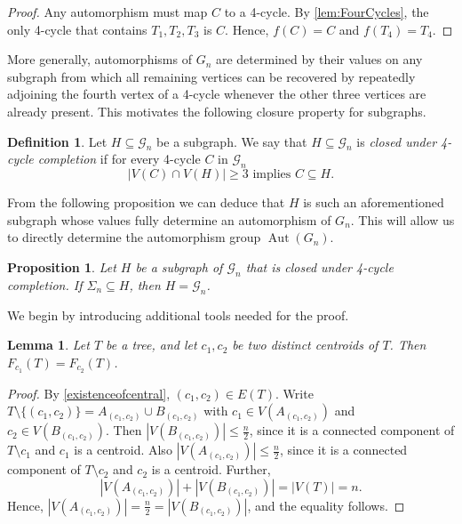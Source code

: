 \documentclass[reqno,dvipsnames]{amsart}
\theoremstyle{plain}
\newtheorem{lemma}[theorem]{Lemma}
\newtheorem{proposition}[theorem]{Proposition}
\numberwithin{equation}{section}
\theoremstyle{definition}
\newtheorem{definition}[theorem]{Definition}
\DeclareMathOperator{\Aut}{Aut}
\begin{document}
		\begin{proof}
			Any automorphism must map $C$ to a 4-cycle. By \autoref{lem:FourCycles}, the only 4-cycle that contains $T_1,T_2,T_3$ is $C$. Hence, $f(C) = C$ and $f(T_4) = T_4$. 
		\end{proof}

		More generally, automorphisms of $G_n$ are determined by their values on any subgraph from which all remaining vertices can be recovered by repeatedly adjoining the fourth vertex of a 4-cycle whenever the other three vertices are already present. This motivates the following closure property for subgraphs.

		\begin{definition} \label{def:FourCycleCompletion}
			Let $H \subseteq \mathcal{G}_n$ be a subgraph. We say that $H\subseteq \mathcal{G}_n$ is \textit{closed under 4-cycle completion} if for every 4-cycle $C$ in $\mathcal{G}_n$ 
			\begin{equation}
				|V(C) \cap V(H)| \geq 3 \text{ implies } C\subseteq H.
			\end{equation}
		\end{definition}

		From the following proposition we can deduce that $H$ is such an aforementioned subgraph whose values fully determine an automorphism of $G_n$. This will allow us to directly determine the automorphism group $\Aut(G_n)$.

		\begin{proposition} \label{prop:FourCycleCompletion}
			Let $H$ be a subgraph of $\mathcal{G}_n$ that is closed under 4-cycle completion. If $\Sigma_n \subseteq H$, then $H = \mathcal{G}_n$.
		\end{proposition}

		We begin by introducing additional tools needed for the proof.

		\begin{lemma} \label{lem:MaxComponentCentroid}
			Let $T$ be a tree, and let $c_1, c_2$ be two distinct centroids of $T$. Then $F_{c_1}(T) = F_{c_2}(T)$. 
		\end{lemma}

		\begin{proof}
			By \autoref{existenceofcentral}, $(c_1, c_2) \in E(T)$. Write $T\setminus \{(c_1,c_2)\} = A_{(c_1,c_2)} \cup B_{(c_1,c_2)}$ with $c_1 \in V(A_{(c_1,c_2)})$ and $c_2 \in V(B_{(c_1,c_2)})$. Then $|V(B_{(c_1,c_2)})| \leq \frac{n}{2}$, since it is a connected component of $T\setminus c_1$ and $c_1$ is a centroid. Also $|V(A_{(c_1,c_2)})| \leq \frac{n}{2}$, since it is a connected component of $T\setminus c_2$ and $c_2$ is a centroid. Further,
			\[
				|V(A_{(c_1,c_2)})| + |V(B_{(c_1,c_2)})| = |V(T)| = n.
			\] 
			Hence, $|V(A_{(c_1,c_2)})| = \frac{n}{2} = |V(B_{(c_1,c_2)})|$, and the equality follows.
		\end{proof}
\end{document}
